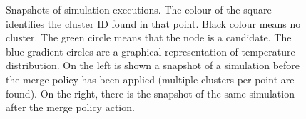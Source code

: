 \begin{figure}[t]
\begin{subfigure}[b]{0.45\textwidth}
  \end{subfigure}
  \centering
  \caption[Snapshots of simulation executions during the sensing-driven clustering.]{Snapshots of simulation executions. 
  The colour of the square identifies the cluster ID found in that point. 
  Black colour means no cluster. 
  The green circle means that the node is a candidate. 
  The blue gradient circles are a graphical representation of temperature distribution. 
  On the left is shown a snapshot of a simulation before the merge policy has been applied (multiple clusters per point are found). 
  On the right, there is the snapshot of the same simulation after the merge policy action.}
  \label{fig:simulation-snapshot}
\end{figure}